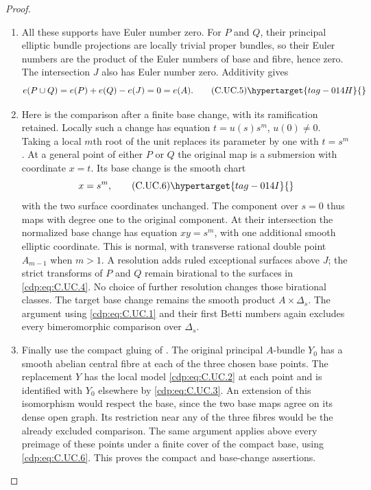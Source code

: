 \begin{proof}
\begin{enumerate}[label={$\langle1\rangle$\arabic*.},leftmargin=*]
\item All these supports have Euler number zero.
For $P$ and $Q$, their principal elliptic
bundle projections are locally trivial
proper bundles, so their Euler numbers are
the product of the Euler numbers of base
and fibre, hence zero. The intersection
$J$ also has Euler number zero. Additivity
gives
\[
                    e(P\cup Q)=e(P)+e(Q)-e(J)=0=e(A).
\tag{C.UC.5}\hypertarget{tag-014H}{}\label{cdp:eq:C.UC.5}
\]

\item Here is the comparison after a finite base
change, with its ramification retained.
Locally such a change has equation
$t=u(s)s^m$, $u(0)\ne0$. Taking a local
$m$th root of the unit replaces its
parameter by one with $t=s^m$.
At a general point of either $P$ or $Q$
the original map is a submersion with
coordinate $x=t$. Its base change is the
smooth chart
\[
                          x=s^m,
\tag{C.UC.6}\hypertarget{tag-014I}{}\label{cdp:eq:C.UC.6}
\]
with the two surface coordinates unchanged.
The component over $s=0$ thus maps with
degree one to the original component.
At their intersection the normalized base
change has equation $xy=s^m$, with one
additional smooth elliptic coordinate.
This is normal, with transverse rational
double point $A_{m-1}$ when $m>1$.
A resolution adds ruled exceptional
surfaces above $J$; the strict transforms
of $P$ and $Q$ remain birational to the
surfaces in \eqref{cdp:eq:C.UC.4}. No choice of further
resolution changes those birational
classes. The target base change remains
the smooth product $A\times\Delta_s$.
The argument using \eqref{cdp:eq:C.UC.1} and their
first Betti numbers again excludes every
bimeromorphic comparison over $\Delta_s$.

\item Finally use the compact gluing of .
The original principal $A$-bundle $Y_0$
has a smooth abelian central fibre at
each of the three chosen base points.
The replacement $Y$ has the local model
\eqref{cdp:eq:C.UC.2} at each point and is identified
with $Y_0$ elsewhere by \eqref{cdp:eq:C.UC.3}.
An extension of this isomorphism would
respect the base, since the two base
maps agree on its dense open graph.
Its restriction near any of the three
fibres would be the already excluded
comparison. The same argument applies
above every preimage of these points
under a finite cover of the compact base,
using \eqref{cdp:eq:C.UC.6}. This proves the compact
and base-change assertions.


\end{enumerate}
\end{proof}
